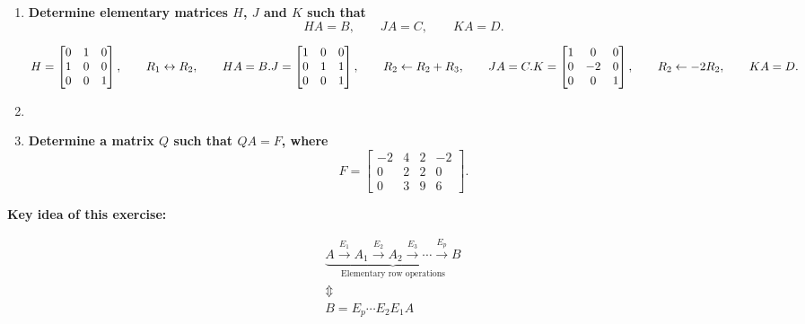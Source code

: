 \begin{enumerate}[label=\alph*)]

\item \textbf{Determine elementary matrices
$H$, $J$ and $K$ such that}
$$
    HA=B,\qquad JA=C,\qquad KA=D.
$$

\begin{answer}
    $H=
    \begin{bmatrix}
        0 & 1 & 0 \\
        1 & 0 & 0 \\
        0 & 0 & 1
    \end{bmatrix},
    \qquad
    R_1 \leftrightarrow R_2,
    \qquad HA=B.
    \\[1.0em]
    J=
    \begin{bmatrix}
        1 & 0 & 0 \\
        0 & 1 & 1 \\
        0 & 0 & 1
    \end{bmatrix},
    \qquad
    R_2 \leftarrow R_2+R_3,
    \qquad JA=C.
    \\[1.0em]
    K=
    \begin{bmatrix}
        1 & 0 & 0 \\
        0 & -2 & 0 \\
        0 & 0 & 1
    \end{bmatrix},
    \qquad
    R_2 \leftarrow -2R_2,
    \qquad KA=D.
    $ \\[1.0em]
\end{answer}

    \item 


    \item \textbf{Determine a matrix $Q$
    such that $QA=F$, where}
    $$
    F=
    \begin{bmatrix}
        -2 & 4 & 2 & -2 \\
         0 & 2 & 2 & 0 \\
         0 & 3 & 9 & 6
    \end{bmatrix}.
    $$
    \begin{answer}
    \end{answer}

\end{enumerate}

\noindent\textbf{Key idea of this exercise:}

$$
    \begin{gathered}
    \underbrace{
        A \xrightarrow{E_1} A_1
        \xrightarrow{E_2} A_2
        \xrightarrow{E_3} \cdots
        \xrightarrow{E_p} B
    }_{\text{Elementary row operations}}
    \\[0.75em]
    \Updownarrow
    \\[0.75em]
    \boxed{B=E_p\cdots E_2E_1A}
    \end{gathered}
$$